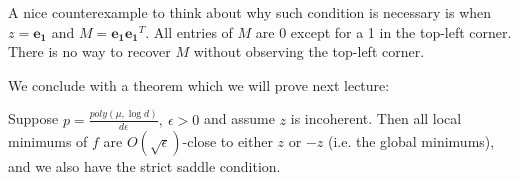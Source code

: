 \begin{remark}
A nice counterexample to think about why such condition is necessary is when $z = \mathbf{e_1}$ and $M = \mathbf{e_1}\mathbf{e_1}^T$. All entries of $M$ are 0 except for a 1 in the top-left corner. There is no way to recover $M$ without observing the top-left corner.
\end{remark}

We conclude with a theorem which we will prove next lecture:
\begin{theorem}
Suppose $p = \frac{poly(\mu, \log d)}{d\epsilon}, \ \epsilon > 0$ and assume $z$ is incoherent. Then all local minimums of $f$ are $O(\sqrt{\epsilon})$-close to either $z$ or $-z$ (i.e. the global minimums), and we also have the strict saddle condition.
\end{theorem}
